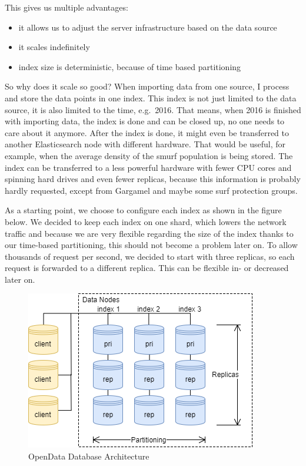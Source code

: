 This gives us multiple advantages:

\begin{itemize}
\tightlist
\item
  it allows us to adjust the server infrastructure based on the data
  source
\item
  it scales indefinitely
\item
  index size is deterministic, because of time based partitioning
\end{itemize}

So why does it scale so good? When importing data from one source, I
process and store the data points in one index. This index is not just
limited to the data source, it is also limited to the time, e.g.~2016.
That means, when 2016 is finished with importing data, the index is done
and can be closed up, no one needs to care about it anymore. After the
index is done, it might even be transferred to another Elasticsearch
node with different hardware. That would be useful, for example, when
the average density of the smurf population is being stored. The index
can be transferred to a less powerful hardware with fewer CPU cores and
spinning hard drives and even fewer replicas, because this information
is probably hardly requested, except from Gargamel and maybe some surf
protection groups.

As a starting point, we choose to configure each index as shown in the
figure below. We decided to keep each index on one shard, which lowers
the network traffic and because we are very flexible regarding the size
of the index thanks to our time-based partitioning, this should not
become a problem later on. To allow thousands of request per second, we
decided to start with three replicas, so each request is forwarded to a
different replica. This can be flexible in- or decreased later on.

\begin{figure}[htbp]
\centering
\includegraphics{images/07_database_architecture.png}
\caption{OpenData Database Architecture}
\end{figure}

